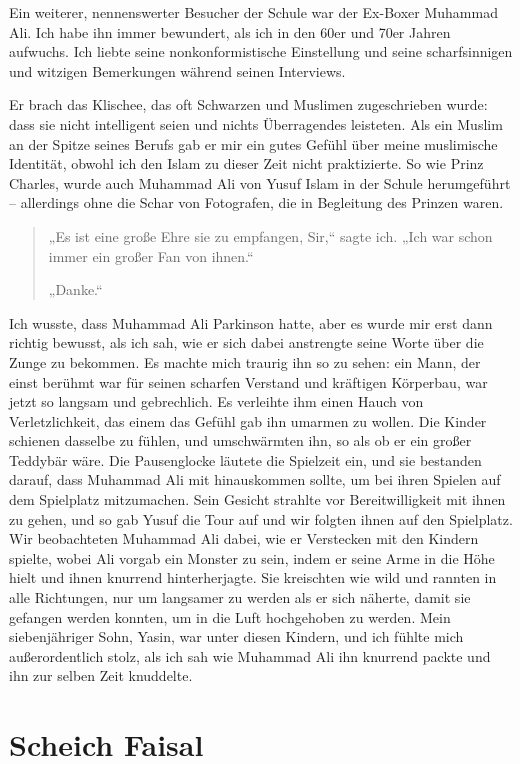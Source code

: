 \documentclass[12pt]{memoir}
\def\–{\hskip0pt-\hskip0pt}
\begin{document}
Ein weiterer, nennenswerter Besucher der Schule war der Ex\–Boxer Muhammad Ali.
Ich habe ihn immer bewundert, als ich in den 60er und 70er Jahren aufwuchs.
Ich liebte seine nonkonformistische Einstellung
und seine scharfsinnigen und witzigen Bemerkungen während seinen Interviews.

Er brach das Klischee, das oft Schwarzen und Muslimen zugeschrieben wurde:
dass sie nicht intelligent seien und nichts Überragendes leisteten.
Als ein Muslim an der Spitze seines Berufs
gab er mir ein gutes Gefühl über meine muslimische Identität,
obwohl ich den Islam zu dieser Zeit nicht praktizierte.
So wie Prinz Charles, wurde auch Muhammad Ali
von Yusuf Islam in der Schule herumgeführt –
allerdings ohne die Schar von Fotografen,
die in Begleitung des Prinzen waren.

\begin{quote}
„Es ist eine große Ehre sie zu empfangen, Sir,“ sagte ich.
„Ich war schon immer ein großer Fan von ihnen.“

„Danke.“
\end{quote}

Ich wusste, dass Muhammad Ali Parkinson hatte,
aber es wurde mir erst dann richtig bewusst, als ich sah,
wie er sich dabei anstrengte seine Worte über die Zunge zu bekommen.
Es machte mich traurig ihn so zu sehen:
ein Mann, der einst berühmt war
für seinen scharfen Verstand und kräftigen Körperbau,
war jetzt so langsam und gebrechlich.
Es verleihte ihm einen Hauch von Verletzlichkeit,
das einem das Gefühl gab ihn umarmen zu wollen.
Die Kinder schienen dasselbe zu fühlen,
und umschwärmten ihn, so als ob er ein großer Teddybär wäre.
Die Pausenglocke läutete die Spielzeit ein, und sie bestanden darauf,
dass Muhammad Ali mit hinauskommen sollte,
um bei ihren Spielen auf dem Spielplatz mitzumachen.
Sein Gesicht strahlte vor Bereitwilligkeit mit ihnen zu gehen,
und so gab Yusuf die Tour auf und wir folgten ihnen auf den Spielplatz.
Wir beobachteten Muhammad Ali dabei,
wie er Verstecken mit den Kindern spielte,
wobei Ali vorgab ein Monster zu sein, indem er seine Arme in die Höhe hielt
und ihnen knurrend hinterherjagte.
Sie kreischten wie wild und rannten in alle Richtungen,
nur um langsamer zu werden als er sich näherte,
damit sie gefangen werden konnten,
um in die Luft hochgehoben zu werden.
Mein siebenjähriger Sohn, Yasin, war unter diesen Kindern,
und ich fühlte mich außerordentlich stolz,
als ich sah wie Muhammad Ali ihn knurrend packte
und ihn zur selben Zeit knuddelte.

\chapter{Scheich Faisal}
\end{document}
